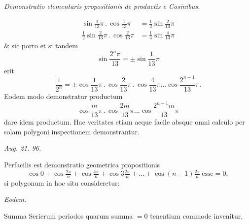\NoSourceHead
{}
\begin{center}\itshape Demonstratio elementaris propositionis de productis e Cosinibus.\end{center}
\[\begin{aligned}
\sin\tfrac1{13}\pi\mathpunct{.}\cos\tfrac1{13}\pi&=\tfrac12\sin\tfrac2{13}\pi\\
\tfrac12\sin\tfrac2{13}\pi\mathpunct{.}\cos\tfrac2{13}\pi&=\tfrac14\sin\tfrac4{13}\pi
\end{aligned}\]
\noindent\& sic porro et si tandem
\[\sin\frac{2^n\pi}{13}=\pm\sin\frac1{13}\pi\]
\noindent erit
\[\frac1{2^n}=\pm\cos\frac1{13}\pi\mathpunct{.}\cos\frac2{13}\pi\mathpunct{.}\cos\frac4{13}\pi\ldots\cos\frac{2^{n-1}}{13}\pi.\]
\noindent Eodem modo demonstratur productum
\[\cos\frac m{13}\pi\mathpunct{.}\cos\frac{2m}{13}\pi\ldots\cos\frac{2^{n-1}m}{13}\pi\]
\noindent dare idem productum. Hae veritates etiam aeque facile absque omni calculo
per solam polygoni inspectionem demonstrantur.
\par\noindent\hfill\textit{Aug. 21. 96.}\par
\ClosingRule
\clearpage
{}
\noindent\hspace*{\parindent}Perfacilis est demonstratio geometrica propositionis
\[\cos0+\cos\tfrac{2\pi}n+\cos\tfrac{4\pi}n+\cos3\tfrac{2\pi}n+\ldots+\cos(n-1)\tfrac{2\pi}n\ \text{esse}=0,\]
\noindent si polygonum in hoc situ consideretur:
\begin{center}
\end{center}
\noindent\hfill\textit{Eodem.}\par
\ClosingRule
{}
\noindent\hspace*{\parindent}Summa Serierum periodos quarum summa $=0$ tenentium commode invenitur,

